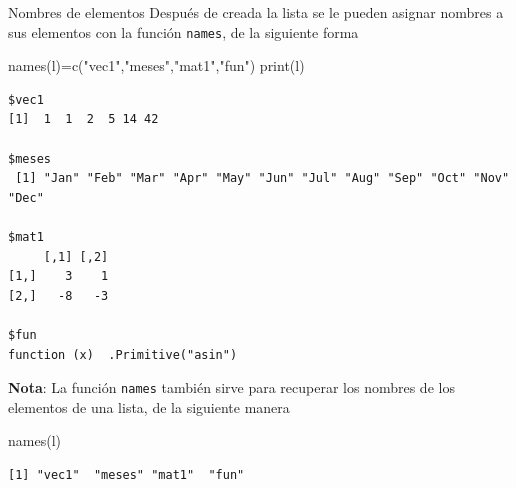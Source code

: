 \documentclass[
  ignorenonframetext,
  aspectratio=169,
  spanish,
]{beamer}
\newenvironment{Shaded}{\begin{snugshade}}{\end{snugshade}}
\newcommand{\FunctionTok}[1]{\textcolor[rgb]{0.28,0.35,0.67}{#1}}
\newcommand{\NormalTok}[1]{\textcolor[rgb]{0.00,0.23,0.31}{#1}}
\newcommand{\OtherTok}[1]{\textcolor[rgb]{0.00,0.23,0.31}{#1}}
\newcommand{\StringTok}[1]{\textcolor[rgb]{0.13,0.47,0.30}{#1}}
\begin{document}
\begin{frame}[fragile]{Nombres de elementos}
\label{nombres-de-elementos}
Después de creada la lista se le pueden asignar nombres a sus elementos
con la función \texttt{names}, de la siguiente forma

\begin{Shaded}
\begin{Highlighting}[]
\FunctionTok{names}\NormalTok{(l)}\OtherTok{=}\FunctionTok{c}\NormalTok{(}\StringTok{"vec1"}\NormalTok{,}\StringTok{"meses"}\NormalTok{,}\StringTok{"mat1"}\NormalTok{,}\StringTok{"fun"}\NormalTok{)}
\FunctionTok{print}\NormalTok{(l)}
\end{Highlighting}
\end{Shaded}

\begin{verbatim}
$vec1
[1]  1  1  2  5 14 42

$meses
 [1] "Jan" "Feb" "Mar" "Apr" "May" "Jun" "Jul" "Aug" "Sep" "Oct" "Nov" "Dec"

$mat1
     [,1] [,2]
[1,]    3    1
[2,]   -8   -3

$fun
function (x)  .Primitive("asin")
\end{verbatim}

\textbf{Nota}: La función \texttt{names} también sirve para recuperar
los nombres de los elementos de una lista, de la siguiente manera

\begin{Shaded}
\begin{Highlighting}[]
\FunctionTok{names}\NormalTok{(l) }
\end{Highlighting}
\end{Shaded}

\begin{verbatim}
[1] "vec1"  "meses" "mat1"  "fun"  
\end{verbatim}
\end{frame}
\end{document}
